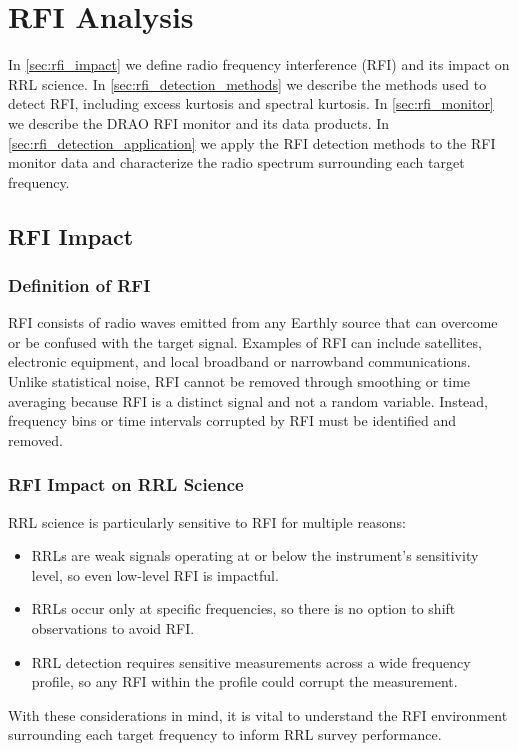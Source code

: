 \chapter{RFI Analysis}
\label{ch:rfi_analysis}
In \autoref{sec:rfi_impact} we define radio frequency interference (RFI) and its impact on RRL science. In \autoref{sec:rfi_detection_methods} we describe the methods used to detect RFI, including excess kurtosis and spectral kurtosis. In \autoref{sec:rfi_monitor} we describe the DRAO RFI monitor and its data products. In \autoref{sec:rfi_detection_application} we apply the RFI detection methods to the RFI monitor data and characterize the radio spectrum surrounding each target frequency.

\section{RFI Impact}
\label{sec:rfi_impact}

\subsection{Definition of RFI}
RFI consists of radio waves emitted from any Earthly source that can overcome or be confused with the target signal. Examples of RFI can include satellites, electronic equipment, and local broadband or narrowband communications. Unlike statistical noise, RFI cannot be removed through smoothing or time averaging because RFI is a distinct signal and not a random variable. Instead, frequency bins or time intervals corrupted by RFI must be identified and removed. \\

\subsection{RFI Impact on RRL Science}
RRL science is particularly sensitive to RFI for multiple reasons:
\begin{itemize}
    \item RRLs are weak signals operating at or below the instrument's sensitivity level, so even low-level RFI is impactful.
    \item RRLs occur only at specific frequencies, so there is no option to shift observations to avoid RFI.
    \item RRL detection requires sensitive measurements across a wide frequency profile, so any RFI within the profile could corrupt the measurement.
\end{itemize}
With these considerations in mind, it is vital to understand the RFI environment surrounding each target frequency to inform RRL survey performance.

